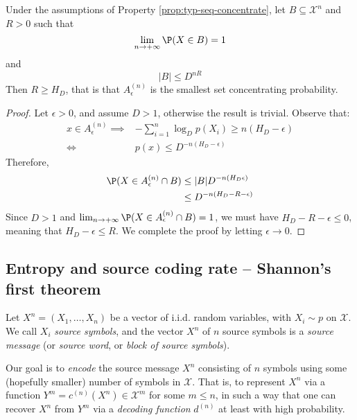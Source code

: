 \documentclass{../cs-classes/cs-classes}
\newcommand*{\X}{\mathcal{X}}
\begin{document}
\begin{property}
    \label{prop:a-eps-smallest}
    Under the assumptions of Property \ref{prop:typ-seq-concentrate}, let $B\subseteq \X^n$ and $R>0$ such that
    \begin{equation*}
        \lim_{n\to+\infty}\P(X\in B)=1
    \end{equation*}
    and
    \begin{equation*}
        |B|\leq D^{nR}
    \end{equation*}
    Then $R\geq H_D$, that is that $A_\epsilon^{(n)}$ is the smallest set concentrating probability.
\end{property}

\begin{proof}
    Let $\epsilon>0$, and assume $D>1$, otherwise the result is trivial. Observe that:
    \begin{equation*}
        \begin{aligned}
            x\in A_\epsilon^{(n)}\implies&-\sum_{i=1}^n \log_D p(X_i)\geq n(H_D-\epsilon)\\
            \iff& p(x)\leq D^{-n(H_D-\epsilon)}
        \end{aligned}
    \end{equation*}
    Therefore,
    \begin{equation*}
        \begin{aligned}
            \P(X\in A_\epsilon^{(n)}\cap B)&\leq |B|D^{-n(H_D\epsilon)}\\
            &\leq D^{-n(H_D-R-\epsilon)}
        \end{aligned}
    \end{equation*}
    Since $D>1$ and $\lim_{n\to+\infty}\P(X\in A_\epsilon^{(n)}\cap B)=1$, we must have $H_D-R-\epsilon\leq 0$, meaning that $H_D-\epsilon\leq R$. We complete the proof by letting $\epsilon\to 0$. 
\end{proof}

\subsection{Entropy and source coding rate -- Shannon's first theorem}
\begin{definition}
    Let $X^n=(X_1, \dots, X_n)$ be a vector of i.i.d. random variables, with $X_i\sim p$ on $\X$. We call $X_i$ \emph{source symbols}, and the vector $X^n$ of $n$ source symbols is a \emph{source message} (or \emph{source word}, or \emph{block of source symbols}). 

    Our goal is to \emph{encode} the source message $X^n$ consisting of $n$ symbols using some (hopefully smaller) number of symbols in $\X$. That is, to represent $X^n$ via a function $Y^m=c^{(n)}(X^n)\in \X^m$ for some $m\leq n$, in such a way that one can recover $X^n$ from $Y^m$ via a \emph{decoding function} $d^{(n)}$ at least with high probability.
\end{definition}
\end{document}
